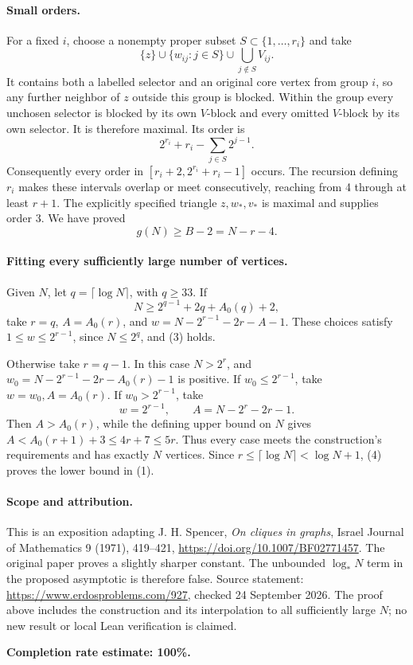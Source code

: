 \paragraph{Small orders.}
For a fixed \(i\), choose a nonempty proper subset \(S\subset\{1,\ldots,r_i\}\) and take
\[
 \{z\}\cup\{w_{ij}:j\in S\}\cup\bigcup_{j\notin S}V_{ij}.
\]
It contains both a labelled selector and an original core vertex from group \(i\), so any further neighbor of \(z\) outside this group is blocked. Within the group every unchosen selector is blocked by its own \(V\)-block and every omitted \(V\)-block by its own selector. It is therefore maximal. Its order is
\[
 2^{r_i}+r_i-\sum_{j\in S}2^{j-1}.
\]
Consequently every order in \([r_i+2,2^{r_i}+r_i-1]\) occurs. The recursion defining \(r_i\) makes these intervals overlap or meet consecutively, reaching from 4 through at least \(r+1\). The explicitly specified triangle \(z,w_*,v_*\) is maximal and supplies order 3. We have proved
\[
 g(N)\geq B-2=N-r-4. \tag{4}
\]

\paragraph{Fitting every sufficiently large number of vertices.}
Given \(N\), let \(q=\lceil\log N\rceil\), with \(q\geq33\). If
\[
 N\geq2^{q-1}+2q+A_0(q)+2,
\]
take \(r=q\), \(A=A_0(r)\), and
\(w=N-2^{r-1}-2r-A-1\). These choices satisfy \(1\leq w\leq2^{r-1}\), since \(N\leq2^q\), and (3) holds.

Otherwise take \(r=q-1\). In this case \(N>2^r\), and
\(w_0=N-2^{r-1}-2r-A_0(r)-1\) is positive. If \(w_0\leq2^{r-1}\), take \(w=w_0,A=A_0(r)\). If \(w_0>2^{r-1}\), take
\[
 w=2^{r-1},\qquad A=N-2^r-2r-1.
\]
Then \(A>A_0(r)\), while the defining upper bound on \(N\) gives
\(A<A_0(r+1)+3\leq4r+7\leq5r\). Thus every case meets the construction's requirements and has exactly \(N\) vertices. Since \(r\leq\lceil\log N\rceil<\log N+1\), (4) proves the lower bound in (1).

\paragraph{Scope and attribution.}
This is an exposition adapting J. H. Spencer, \emph{On cliques in graphs}, Israel Journal of Mathematics 9 (1971), 419--421, \url{https://doi.org/10.1007/BF02771457}. The original paper proves a slightly sharper constant. The unbounded \(\log_*N\) term in the proposed asymptotic is therefore false. Source statement: \url{https://www.erdosproblems.com/927}, checked 24 September 2026. The proof above includes the construction and its interpolation to all sufficiently large \(N\); no new result or local Lean verification is claimed.

\textbf{Completion rate estimate: 100\%.}
